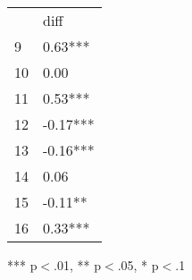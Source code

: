\documentclass{article}
\begin{document}
\begin{table}[!h]
\centering
\begin{tabular}{ll}
\cline{1-2}
\multicolumn{1}{|l}{} &
  \multicolumn{1}{|l|}{diff} \\
\cline{1-2}
\multicolumn{1}{|l}{9} &
  \multicolumn{1}{|l|}{0.63***} \\
\cline{1-2}
\multicolumn{1}{|l}{10} &
  \multicolumn{1}{|l|}{0.00} \\
\cline{1-2}
\multicolumn{1}{|l}{11} &
  \multicolumn{1}{|l|}{0.53***} \\
\cline{1-2}
\multicolumn{1}{|l}{12} &
  \multicolumn{1}{|l|}{-0.17***} \\
\cline{1-2}
\multicolumn{1}{|l}{13} &
  \multicolumn{1}{|l|}{-0.16***} \\
\cline{1-2}
\multicolumn{1}{|l}{14} &
  \multicolumn{1}{|l|}{0.06} \\
\cline{1-2}
\multicolumn{1}{|l}{15} &
  \multicolumn{1}{|l|}{-0.11**} \\
\cline{1-2}
\multicolumn{1}{|l}{16} &
  \multicolumn{1}{|l|}{0.33***} \\
\cline{1-2}
\end{tabular}

\footnotesize{
*** p$<$.01, ** p$<$.05, * p$<$.1
}
\end{table}
\end{document}

